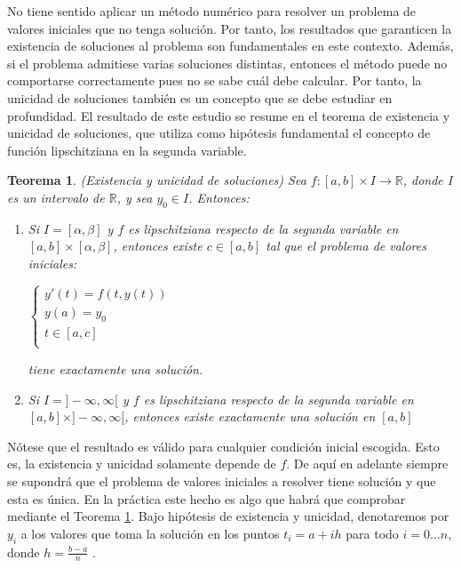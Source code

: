 \documentclass{article}
\theoremstyle{theorem-style}  %
\newtheorem{theorem}{Teorema}[section]  %
\theoremstyle{definition-style}
\theoremstyle{example-style}
\begin{document}
	No tiene sentido aplicar un método numérico para resolver un problema de valores iniciales que no tenga solución. Por tanto, los resultados que garanticen la existencia de soluciones al problema son fundamentales en este contexto. Además, si el problema admitiese varias soluciones distintas, entonces el método puede no comportarse correctamente pues no se sabe cuál debe calcular. Por tanto, la unicidad de soluciones también es un concepto que se debe estudiar en profundidad. El resultado de este estudio se resume en el teorema de existencia y unicidad de soluciones, que utiliza como hipótesis fundamental el concepto de función lipschitziana en la segunda variable.

	\begin{theorem} \label{theorem:existence-uniqueness}
		(Existencia y unicidad de soluciones) Sea $f: [a,b] \times I \rightarrow \mathbb{R}$, donde I es un intervalo de $\mathbb{R}$, y sea $y_0 \in I$. Entonces:
		\begin{enumerate}
			\item Si $I = [\alpha,\beta]$ y $f$ es lipschitziana respecto de la segunda variable en $[a,b]\times[\alpha,\beta]$, entonces existe $c \in [a,b]$ tal que el problema de valores iniciales:
			\begin{center}
				$\begin{cases}
				y'(t) = f(t,y(t)) \\
				y(a) = y_0 \\
				t \in [a,c] \\
				\end{cases}$
			\end{center}
			tiene exactamente una solución.
			\item Si $I = ]-\infty,\infty[$ y $f$ es lipschitziana respecto de la segunda variable en $[a,b]\times]-\infty,\infty[$, entonces existe exactamente una solución en $[a,b]$
		\end{enumerate}
	\end{theorem}

	Nótese que el resultado es válido para cualquier condición inicial escogida. Esto es, la existencia y unicidad solamente depende de $f$. De aquí en adelante siempre se supondrá que el problema de valores iniciales a resolver tiene solución y que esta es única. En la práctica este hecho es algo que habrá que comprobar mediante el Teorema \ref{theorem:existence-uniqueness}. Bajo hipótesis de existencia y unicidad, denotaremos por $y_i$ a los valores que toma la solución en los puntos $t_i = a + ih$ para todo $i = 0 \ldots n$, donde $h = \frac{b-a}{n}$ .
\end{document}
